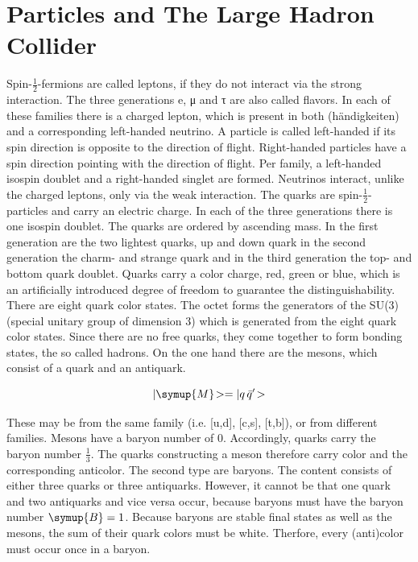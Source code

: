 \chapter{Particles and The Large Hadron Collider}
\label{sec:particleslhc}
Spin-$\frac{1}{2}$-fermions are called leptons, if they do not interact via the strong interaction. The three generations e, μ and τ are also called flavors.
In each of these families there is a charged lepton, which is present in both (h\"andigkeiten) and a corresponding left-handed neutrino. A particle
is called left-handed if its spin direction is opposite to the direction of flight.
Right-handed particles have a spin direction pointing with the direction of flight. Per
family, a left-handed isospin doublet and a right-handed singlet are formed.
Neutrinos interact, unlike the charged leptons, only via the weak
interaction.
The quarks are spin-$\frac{1}{2}$-particles and carry an electric charge. In each of the
three generations there is one isospin doublet. The quarks are ordered by ascending
mass. In the first generation are the two lightest quarks,
up and down quark in the second generation the charm- and strange quark and
in the third generation the top- and bottom quark doublet.
Quarks carry a color charge, red, green or blue, which is an artificially introduced degree of freedom to guarantee the distinguishability. There are eight
quark color states.
The octet forms the generators of the SU(3) (special unitary group of dimension
3) which is generated from the eight quark color states.
Since there are no free quarks, they come together to form bonding states, the
so called hadrons. On the one hand there are the mesons, which consist of a quark
and an antiquark.

\begin{equation}
	|\symup{M}\!> = | q\, \bar{q}'\!>
\end{equation}

These may be from the same family (i.e. [u,d], [c,s], [t,b]), or from
different families. Mesons have a baryon number of 0. Accordingly, quarks carry the baryon number $\frac{1}{3}$. The quarks constructing a meson therefore carry color and the corresponding anticolor.
The second type are baryons. The content consists of either three quarks or
three antiquarks. However, it cannot be that one quark and two antiquarks
and vice versa occur, because baryons must have the baryon number $\symup{B} = 1$. Because baryons are stable final states as well as the mesons, the sum of their quark colors must be white. Therfore, every (anti)color must occur once in a baryon.

